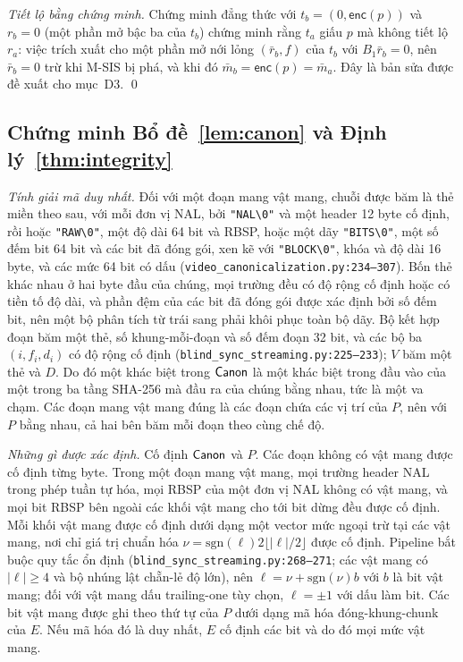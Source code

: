 \emph{Tiết lộ bằng chứng minh.} Chứng minh đẳng thức với $t_b=(0,\mathsf{enc}(p))$
và $r_b=0$ (một phần mở bậc ba của $t_b$) chứng minh rằng $t_a$ giấu $p$ mà
không tiết lộ $r_a$: việc trích xuất cho một phần mở nới lỏng $(\bar r_b,f)$ của
$t_b$ với $B_1\bar r_b=0$, nên $\bar r_b=0$ trừ khi M-SIS bị phá, và khi đó
$\bar m_b=\mathsf{enc}(p)=\bar m_a$. Đây là bản sửa được đề xuất cho mục~D3.
\qed

\subsection{Chứng minh Bổ đề~\ref{lem:canon} và Định lý~\ref{thm:integrity}}

\emph{Tính giải mã duy nhất.} Đối với một đoạn mang vật mang, chuỗi được băm là
thẻ miền theo sau, với mỗi đơn vị NAL, bởi \texttt{"NAL\textbackslash0"} và một
header 12 byte cố định, rồi hoặc \texttt{"RAW\textbackslash0"}, một độ dài 64
bit và RBSP, hoặc một dãy \texttt{"BITS\textbackslash0"}, một số đếm bit 64 bit
và các bit đã đóng gói, xen kẽ với \texttt{"BLOCK\textbackslash0"},
khóa và độ dài 16 byte, và các mức 64 bit có dấu
(\texttt{video\_canonicalization.py:234--307}). Bốn thẻ khác nhau ở hai byte
đầu của chúng, mọi trường đều có độ rộng cố định hoặc có tiền tố độ dài, và phần
đệm của các bit đã đóng gói được xác định bởi số đếm bit, nên một bộ phân tích
từ trái sang phải khôi phục toàn bộ dãy. Bộ kết hợp đoạn băm một thẻ, số
khung-mỗi-đoạn và số đếm đoạn 32 bit, và các bộ ba $(i,f_i,d_i)$ có độ rộng cố
định (\texttt{blind\_sync\_streaming.py:225--233}); $V$ băm một thẻ và $D$. Do
đó một khác biệt trong $\mathsf{Canon}$ là một khác biệt trong đầu vào của một trong ba
tầng SHA-256 mà đầu ra của chúng bằng nhau, tức là một va chạm. Các đoạn mang
vật mang đúng là các đoạn chứa các vị trí của $P$, nên với $P$ bằng nhau, cả hai
bên băm mỗi đoạn theo cùng chế độ.

\emph{Những gì được xác định.} Cố định $\mathsf{Canon}$ và $P$. Các đoạn không có vật
mang được cố định từng byte. Trong một đoạn mang vật mang, mọi trường header NAL
trong phép tuần tự hóa, mọi RBSP của một đơn vị NAL không có vật mang, và mọi
bit RBSP bên ngoài các khối vật mang cho tới bit dừng đều được cố định. Mỗi khối
vật mang được cố định dưới dạng một vector mức ngoại trừ tại các vật mang, nơi
chỉ giá trị chuẩn hóa $\nu=\mathrm{sgn}(\ell)2\lfloor|\ell|/2\rfloor$ được cố
định. Pipeline bắt buộc quy tắc ổn định (\texttt{blind\_sync\_streaming.py:268--271};
các vật mang có $|\ell|\ge4$ và bộ nhúng lật chẵn-lẻ độ lớn), nên
$\ell=\nu+\mathrm{sgn}(\nu)b$ với $b$ là bit vật mang; đối với vật mang dấu
trailing-one tùy chọn, $\ell=\pm1$ với dấu làm bit. Các bit vật mang được ghi
theo thứ tự của $P$ dưới dạng mã hóa đóng-khung-chunk của $E$. Nếu mã hóa đó là
duy nhất, $E$ cố định các bit và do đó mọi mức vật mang.


